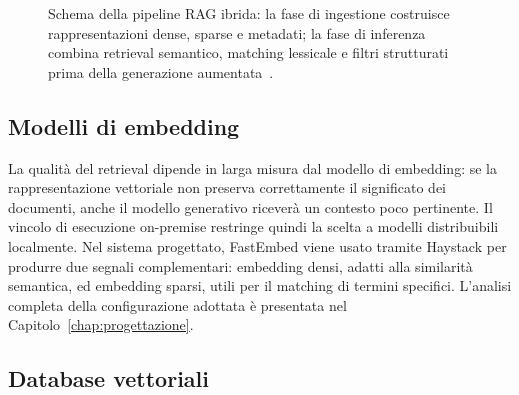 \begin{figure}[ht]
{
  }
  \caption{Schema della pipeline RAG ibrida: la fase di ingestione costruisce
    rappresentazioni dense, sparse e metadati; la fase di inferenza combina
    retrieval semantico, matching lessicale e filtri strutturati prima della
    generazione aumentata~\cite{lewis2020retrieval}.}
  \label{fig:rag_pipeline}
\end{figure}


\subsection{Modelli di embedding}
\label{subsec:embedding_models}

La qualità del retrieval dipende in larga misura dal modello di embedding: se
la rappresentazione vettoriale non preserva correttamente il significato dei
documenti, anche il modello generativo riceverà un contesto poco pertinente. Il
vincolo di esecuzione on-premise restringe quindi la scelta a modelli
distribuibili localmente. Nel sistema progettato, FastEmbed viene usato tramite
Haystack per produrre due segnali complementari: embedding densi, adatti alla
similarità semantica, ed embedding sparsi, utili per il matching di termini
specifici. L'analisi completa della configurazione adottata è presentata nel
Capitolo~\ref{chap:progettazione}.

\subsection{Database vettoriali}
\label{subsec:vector_db}

